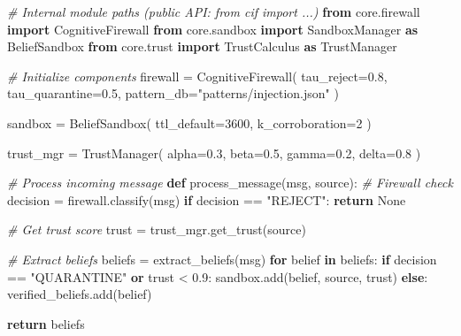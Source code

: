 \documentclass[
]{article}
\newenvironment{Shaded}{}{}
\newcommand{\CommentTok}[1]{\textcolor[rgb]{0.38,0.63,0.69}{\textit{#1}}}
\newcommand{\ControlFlowTok}[1]{\textcolor[rgb]{0.00,0.44,0.13}{\textbf{#1}}}
\newcommand{\DecValTok}[1]{\textcolor[rgb]{0.25,0.63,0.44}{#1}}
\newcommand{\FloatTok}[1]{\textcolor[rgb]{0.25,0.63,0.44}{#1}}
\newcommand{\ImportTok}[1]{\textcolor[rgb]{0.00,0.50,0.00}{\textbf{#1}}}
\newcommand{\KeywordTok}[1]{\textcolor[rgb]{0.00,0.44,0.13}{\textbf{#1}}}
\newcommand{\NormalTok}[1]{#1}
\newcommand{\OperatorTok}[1]{\textcolor[rgb]{0.40,0.40,0.40}{#1}}
\newcommand{\StringTok}[1]{\textcolor[rgb]{0.25,0.44,0.63}{#1}}
\newcommand{\VariableTok}[1]{\textcolor[rgb]{0.10,0.09,0.49}{#1}}
\begin{document}
\begin{Shaded}
\begin{Highlighting}[]
\CommentTok{\# Internal module paths (public API: \textasciigrave{}from cif import ...\textasciigrave{})}
\ImportTok{from}\NormalTok{ core.firewall }\ImportTok{import}\NormalTok{ CognitiveFirewall}
\ImportTok{from}\NormalTok{ core.sandbox }\ImportTok{import}\NormalTok{ SandboxManager }\ImportTok{as}\NormalTok{ BeliefSandbox}
\ImportTok{from}\NormalTok{ core.trust }\ImportTok{import}\NormalTok{ TrustCalculus }\ImportTok{as}\NormalTok{ TrustManager}

\CommentTok{\# Initialize components}
\NormalTok{firewall }\OperatorTok{=}\NormalTok{ CognitiveFirewall(}
\NormalTok{    tau\_reject}\OperatorTok{=}\FloatTok{0.8}\NormalTok{,}
\NormalTok{    tau\_quarantine}\OperatorTok{=}\FloatTok{0.5}\NormalTok{,}
\NormalTok{    pattern\_db}\OperatorTok{=}\StringTok{"patterns/injection.json"}
\NormalTok{)}

\NormalTok{sandbox }\OperatorTok{=}\NormalTok{ BeliefSandbox(}
\NormalTok{    ttl\_default}\OperatorTok{=}\DecValTok{3600}\NormalTok{,}
\NormalTok{    k\_corroboration}\OperatorTok{=}\DecValTok{2}
\NormalTok{)}

\NormalTok{trust\_mgr }\OperatorTok{=}\NormalTok{ TrustManager(}
\NormalTok{    alpha}\OperatorTok{=}\FloatTok{0.3}\NormalTok{, beta}\OperatorTok{=}\FloatTok{0.5}\NormalTok{, gamma}\OperatorTok{=}\FloatTok{0.2}\NormalTok{,}
\NormalTok{    delta}\OperatorTok{=}\FloatTok{0.8}
\NormalTok{)}

\CommentTok{\# Process incoming message}
\KeywordTok{def}\NormalTok{ process\_message(msg, source):}
    \CommentTok{\# Firewall check}
\NormalTok{    decision }\OperatorTok{=}\NormalTok{ firewall.classify(msg)}
    \ControlFlowTok{if}\NormalTok{ decision }\OperatorTok{==} \StringTok{"REJECT"}\NormalTok{:}
        \ControlFlowTok{return} \VariableTok{None}

    \CommentTok{\# Get trust score}
\NormalTok{    trust }\OperatorTok{=}\NormalTok{ trust\_mgr.get\_trust(source)}

    \CommentTok{\# Extract beliefs}
\NormalTok{    beliefs }\OperatorTok{=}\NormalTok{ extract\_beliefs(msg)}
    \ControlFlowTok{for}\NormalTok{ belief }\KeywordTok{in}\NormalTok{ beliefs:}
        \ControlFlowTok{if}\NormalTok{ decision }\OperatorTok{==} \StringTok{"QUARANTINE"} \KeywordTok{or}\NormalTok{ trust }\OperatorTok{\textless{}} \FloatTok{0.9}\NormalTok{:}
\NormalTok{            sandbox.add(belief, source, trust)}
        \ControlFlowTok{else}\NormalTok{:}
\NormalTok{            verified\_beliefs.add(belief)}

    \ControlFlowTok{return}\NormalTok{ beliefs}
\end{Highlighting}
\end{Shaded}
\end{document}

